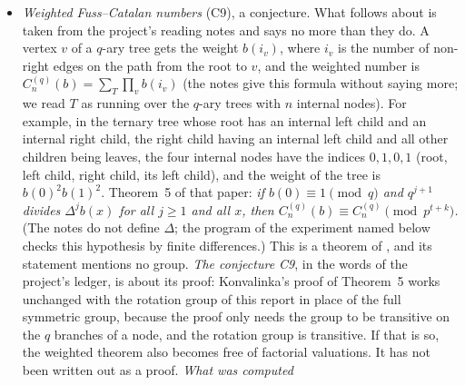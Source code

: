 \documentclass[11pt]{article}
\theoremstyle{definition}
\theoremstyle{remark}
\numberwithin{equation}{section}
\numberwithin{figure}{section}
\begin{document}
\begin{itemize}[itemsep=1pt]
 With all $b_i=1$ this is the divisibility half of the theorem. It is \emph{not} the weighted theorem of
 \cite[Theorem~5]{Konvalinka}, which is quoted in the next item:
 there the weight of a vertex depends on the number of non-right edges on the path from the root, which
 rotations change, and the conclusion is a congruence, not only a divisibility. (Of the paper
 \cite{PostnikovSagan} on weighted Catalan numbers the project has one reading: an AI system read the full
 text of its arXiv version on the first day of the event, to look for overlap with the main proof; no person
 has read it, and the corollary is not compared with that paper here.) The corollary says nothing
 about exactness; it records what the rotation argument gives for weights with no further idea. Tested
 beforehand on random integer weights ($q\in\{2,3,4,5,8,9\}$, $n\le14$; the program is not kept in the
 repository). No search of the literature was made for it.
\item \emph{Weighted Fuss--Catalan numbers} (C9), a conjecture. What follows about \cite{Konvalinka} is taken
 from the project's reading notes and says no more than they do. A vertex $v$ of a $q$-ary tree gets the
 weight $b(i_v)$, where $i_v$ is the number of non-right edges on the path from the root to $v$, and the
 weighted number is $C_n^{(q)}(b)=\sum_T\prod_vb(i_v)$ (the notes give this formula without saying more; we
 read $T$ as running over the $q$-ary trees with $n$ internal nodes). For example, in the ternary tree whose
 root has an internal left child and an internal right child, the right child having an internal left child
 and all other children being leaves, the four internal nodes have the indices $0,1,0,1$ (root, left child,
 right child, its left child), and the weight of the tree is $b(0)^2b(1)^2$. Theorem~5 of that paper: \emph{if $b(0)\equiv1\pmod q$ and $q^{j+1}$ divides $\Delta^jb(x)$ for all
 $j\ge1$ and all $x$, then $C_n^{(q)}(b)\equiv C_n^{(q)}\pmod{p^{t+k}}$.} (The notes do not define $\Delta$;
 the program of the experiment named below checks this hypothesis by finite differences.) This is a theorem of
 \cite{Konvalinka}, and its statement mentions no group. \emph{The conjecture C9}, in the words of the
 project's ledger, is about its proof: Konvalinka's proof of Theorem~5 works unchanged with the rotation group
 of this report in place of the full symmetric group, because the proof only needs the group to be transitive
 on the $q$ branches of a node, and the rotation group is transitive. If that is so, the weighted theorem
 also becomes free of factorial valuations. It has not been written out as a proof. \emph{What was computed}

\end{itemize}
\end{document}
